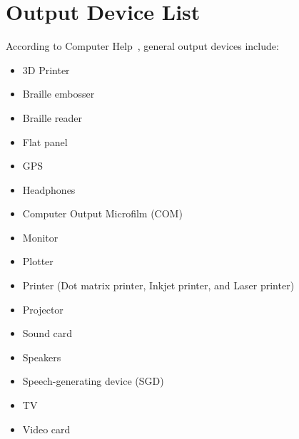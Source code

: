 \chapter{Output Device List}
\label{appendix:output_devices_list}

According to Computer Help~\cite{output_device}, general output devices include:

\begin{itemize}
  \item 3D Printer
  \item Braille embosser
  \item Braille reader
  \item Flat panel
  \item GPS
  \item Headphones
  \item Computer Output Microfilm (COM)
  \item Monitor
  \item Plotter
  \item Printer (Dot matrix printer, Inkjet printer, and Laser printer)
  \item Projector
  \item Sound card
  \item Speakers
  \item Speech-generating device (SGD)
  \item TV
  \item Video card
\end{itemize}

